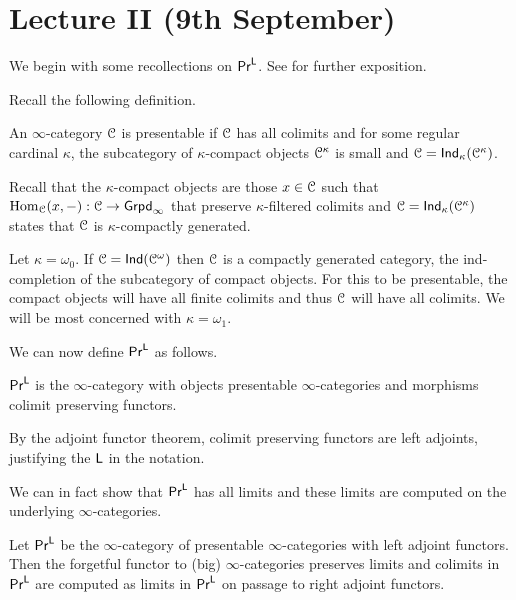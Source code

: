 \section{Lecture II (9th September)}\label{sec: Matthew II}
We begin with some recollections on $\catPr^{\Lsf}$. See \cite[\S 5]{HTT} for further exposition. 

Recall the following definition. 
\begin{definition}\label{def: presentable category}
    An $\infty$-category $\EuScript{C}$ is presentable if $\EuScript{C}$ has all colimits and for some regular cardinal $\kappa$, the subcategory of $\kappa$-compact objects $\EuScript{C}^{\kappa}$ is small and $\EuScript{C}=\mathsf{Ind}_{\kappa}(\EuScript{C}^{\kappa})$. 
\end{definition}
\begin{remark}
    Recall that the $\kappa$-compact objects are those $x\in\EuScript{C}$ such that $\mathrm{Hom}_{\EuScript{C}}(x,-):\EuScript{C}\to\mathsf{Grpd}_{\infty}$ that preserve $\kappa$-filtered colimits and $\EuScript{C}=\mathsf{Ind}_{\kappa}(\EuScript{C}^{\kappa})$ states that $\EuScript{C}$ is $\kappa$-compactly generated. 
\end{remark}
\begin{example}
    Let $\kappa=\omega_{0}$. If $\EuScript{C}=\mathsf{Ind}(\EuScript{C}^{\omega})$ then $\EuScript{C}$ is a compactly generated category, the ind-completion of the subcategory of compact objects. For this to be presentable, the compact objects will have all finite colimits and thus $\EuScript{C}$ will have all colimits. We will be most concerned with $\kappa=\omega_{1}$. 
\end{example}
We can now define $\catPr^{\Lsf}$ as follows. 
\begin{definition}[$\catPr^{\Lsf}$]\label{def: PrL}
    $\catPr^{\Lsf}$ is the $\infty$-category with objects presentable $\infty$-categories and morphisms colimit preserving functors. 
\end{definition}
\begin{remark}
    By the adjoint functor theorem, colimit preserving functors are left adjoints, justifying the $\mathsf{L}$ in the notation. 
\end{remark}
We can in fact show that $\catPr^{\Lsf}$ has all limits and these limits are computed on the underlying $\infty$-categories. 
\begin{proposition}
    Let $\catPr^{\Lsf}$ be the $\infty$-category of presentable $\infty$-categories with left adjoint functors. Then the forgetful functor to (big) $\infty$-categories preserves limits and colimits in $\catPr^{\Lsf}$ are computed as limits in $\catPr^{\Lsf}$ on passage to right adjoint functors. 
\end{proposition}
